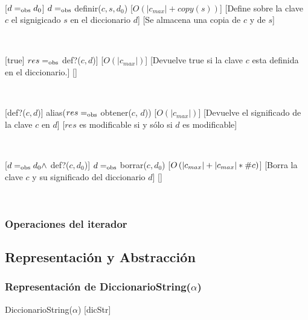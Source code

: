 ~

[$d =_{\mathrm{obs}} d_0$]
{$d =_{\mathrm{obs}}$ definir($c, s, d_0$)}
[$O(|c_{max}| + copy(s))$]
[Define sobre la clave $c$ el signigicado $s$ en el diccionario $d$]
[Se almacena una copia de $c$ y de $s$]

~

[true]
{$res =_{\mathrm{obs}}$ def?($c, d$)]}
[$O(|c_{max}|)$]
[Devuelve true si la clave $c$ esta definida en el diccionario.]
[]

~

[def?($c, d$)]
{alias($res =_{\mathrm{obs}}$ obtener($c$, $d$))}
[$O(|c_{max}|)$]
[Devuelve el significado de la clave $c$ en $d$]
[$res$ es modificable si y sólo si $d$ es modificable]

~

[$d =_{\mathrm{obs}} d_0 \land$ def?($c, d_0$)]
{$d =_{\mathrm{obs}}$ borrar($c, d_0$)}
[$O\left(|c_{max}| + |c_{max}| * \#c\right)$]
[Borra la clave $c$ y su significado del diccionario $d$]
[]

~


\subsubsection{Operaciones del iterador}


\subsection{Representación y Abstracción}

\subsubsection{Representación de DiccionarioString(\texorpdfstring{$\alpha$}{α})}

\begin{Estructura}{ DiccionarioString($\alpha$) }[dicStr]
	\begin{Tupla}[dicStr]
	\end{Tupla}

	~

	\begin{Tupla}[Nodo]
	\end{Tupla}

\end{Estructura}

